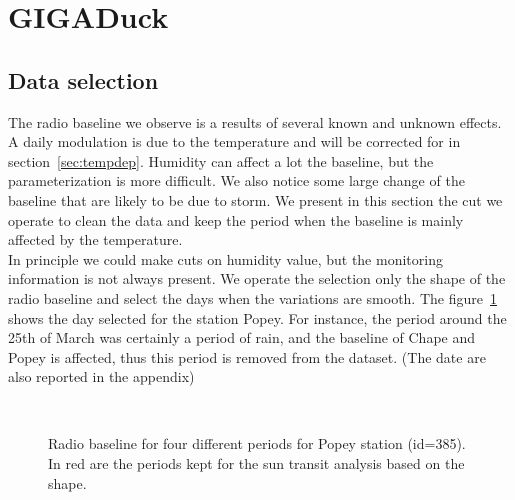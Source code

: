 \section{GIGADuck}
\subsection{Data selection}
The  radio baseline  we  observe is  a  results of  several known  and
unknown effects. A daily modulation is due to the temperature and will
be corrected for in  section~\ref{sec:tempdep}.  Humidity can affect a
lot the baseline, but the  parameterization is more difficult. We also
notice some large change of the  baseline that are likely to be due to
storm.  We  present in this  section the cut  we operate to  clean the
data and keep  the period when the baseline is  mainly affected by the
temperature.\\In principle  we could make cuts on  humidity value, but
the  monitoring information  is not  always present.   We  operate the
selection only  the shape  of the radio  baseline and select  the days
when  the variations  are smooth.   The figure~\ref{fig:selectedpopey}
shows  the day  selected for  the  station Popey.   For instance,  the
period around  the 25th of March  was certainly a period  of rain, and
the  baseline of  Chape and  Popey is  affected, thus  this  period is
removed  from  the  dataset.   (The  date are  also  reported  in  the
appendix)

\begin{figure}[!ht]
  \centering
  \hspace*{-3ex}
  \\
  \caption{Radio baseline for four different periods for Popey station
    (id=385). In  red are the periods  kept for the  sun transit analysis
    based on the shape.}
 \label{fig:selectedpopey}
\end{figure}

